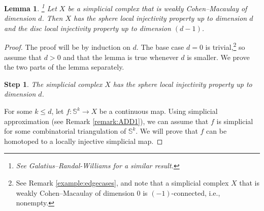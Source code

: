 \documentclass[11pt]{amsart}
\numberwithin{equation}{section}
\theoremstyle{plain}
\newtheorem{lemma}[theorem]{Lemma}
\newtheorem{stepsb}{Step}
\theoremstyle{definition}
\theoremstyle{remark}
\newcommand\bbS{\ensuremath{\mathbb{S}}}
\begin{document}
\begin{lemma}\hspace{-5pt}\footnote{See Galatius--Randal-Williams \cite[Theorem 2.4]{GRW} for a similar result.}
\label{lemma:makeinjectivecm}
Let $X$ be a simplicial complex that is weakly Cohen--Macaulay of dimension $d$.  Then
$X$ has the sphere local injectivity property up to dimension $d$ and the disc local injectivity
property up to dimension $(d-1)$.
\end{lemma}
\begin{proof}
The proof will be by induction on $d$.  The base case $d=0$ is trivial,\footnote{See Remark \ref{example:edgecases}, and
note that a simplicial complex $X$ that is weakly Cohen--Macaulay of dimension $0$ is $(-1)$-connected, i.e., nonempty.} so assume that $d>0$ and that
the lemma is true whenever $d$ is smaller.  We prove the two parts of the lemma separately.

\begin{stepsb}
The simplicial complex $X$ has the sphere local injectivity property up to dimension $d$.
\end{stepsb}

For some $k \leq d$, let $f\colon \bbS^k \rightarrow X$ be a continuous map.  Using simplicial
approximation (see Remark \ref{remark:ADD1}), 
we can assume that $f$ is simplicial for some combinatorial triangulation of
$\bbS^k$.  We will prove that $f$ can be homotoped to a locally injective simplicial map.


\end{proof}
\end{document}
